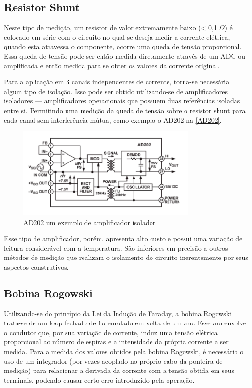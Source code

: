 \subsection{Resistor Shunt}\label{subsec:resiShunt}
Neste tipo de medição, um resistor de valor extremamente baixo (< 0,1 $\Omega$) é colocado em série com o circuito no qual se deseja medir a corrente elétrica, quando esta atravessa o componente, ocorre uma queda de tensão proporcional. Essa queda de tensão pode ser então medida diretamente através de um \gls{ADC} ou amplificada e então medida para se obter os valores da corrente original. \citep{curr_sens_tech}

Para a aplicação em 3 canais independentes de corrente, torna-se necessária algum tipo de isolação. Isso pode ser obtido utilizando-se de amplificadores isoladores --- amplificadores operacionais que possuem duas referências isoladas entre si. Permitindo uma medição da queda de tensão sobre o resistor shunt para cada canal sem interferência mútua, como exemplo o AD202 na \autoref{AD202}.

\begin{figure}[htb]
    \caption{AD202 um exemplo de amplificador isolador}
    \label{AD202}
    \includegraphics[width=0.8\textwidth]{figuras/AD202-ampop-isolado.png}
\end{figure}
    
Esse tipo de amplificador, porém, apresenta alto custo e possui uma variação de leitura considerável com a temperatura. São inferiores em precisão a outros métodos de medição que realizam o isolamento do circuito inerentemente por seus aspectos construtivos. 

\subsection{Bobina Rogowski}\label{subsec:Rogowski}

Utilizando-se do princípio da Lei da Indução de Faraday, a bobina Rogowski trata-se de um loop fechado de fio enrolado em volta de um aro. Esse aro envolve o condutor que, por sua variação de corrente, induz uma tensão elétrica proporcional ao número de espiras e a intensidade da própria corrente a ser medida. Para a medida dos valores obtidos pela bobina Rogowski, é necessário o uso de um integrador (por vezes acoplado no próprio cabo da ponteira de medição) para relacionar a derivada da corrente com a tensão obtida em seus terminais, podendo causar certo erro introduzido pela operação.

